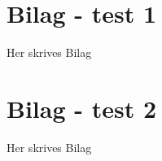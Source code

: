 \chapter{Bilag - test 1}\label{ch:Bilag1label}
Her skrives Bilag

\chapter{Bilag - test 2}\label{ch:Bilag2label}
Her skrives Bilag

